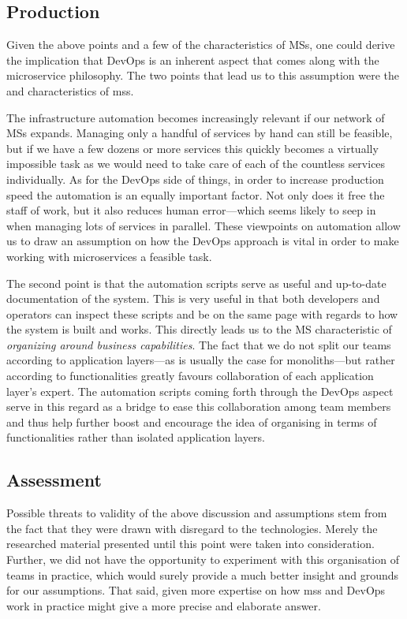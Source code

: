 \subsection{Production}

Given the above points and a few of the characteristics of MSs, one
could derive the implication that DevOps is an inherent aspect that
comes along with the microservice philosophy. The two points that lead
us to this assumption were the  and
 characteristics of \glspl{ms}.

The infrastructure automation becomes increasingly relevant if our
network of MSs expands. Managing only a handful of services by hand
can still be feasible, but if we have a few dozens or more services
this quickly becomes a virtually impossible task as we would need to
take care of each of the countless services individually. As for the
DevOps side of things, in order to increase production speed the
automation is an equally important factor. Not only does it free the
staff of work, but it also reduces human error---which seems likely to
seep in when managing lots of services in parallel. These viewpoints
on automation allow us to draw an assumption on how the DevOps
approach is vital in order to make working with microservices a
feasible task.

The second point is that the automation scripts serve as useful and
up-to-date documentation of the system. This is very useful in that
both developers and operators can inspect these scripts and be on the
same page with regards to how the system is built and works. This
directly leads us to the MS characteristic of \textit{organizing
around business capabilities}. The fact that we do not split our teams
according to application layers---as is usually the case for
monoliths---but rather according to functionalities greatly favours
collaboration of each application layer's expert. The automation
scripts coming forth through the DevOps aspect serve in this regard as
a bridge to ease this collaboration among team members and thus help
further boost and encourage the idea of organising in terms of
functionalities rather than isolated application layers.

\subsection{Assessment}

Possible threats to validity of the above discussion and assumptions
stem from the fact that they were drawn with disregard to the
technologies. Merely the researched material presented until this
point were taken into consideration.  Further, we did not have the
opportunity to experiment with this organisation of teams in practice,
which would surely provide a much better insight and grounds for our
assumptions.  That said, given more expertise on how \glspl{ms} and
DevOps work in practice might give a more precise and elaborate
answer.


